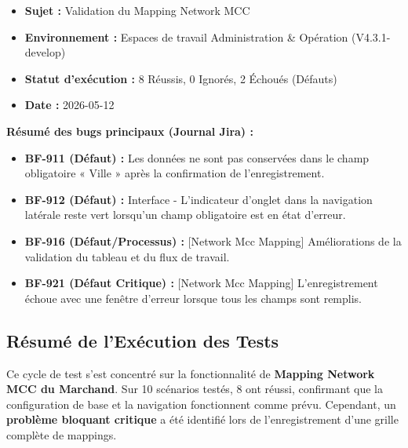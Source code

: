 \begin{tcolorbox}[colback=primary!5, colframe=primary, title=Aperçu du Projet \& Constats Critiques, arc=5pt]
    \begin{itemize}[leftmargin=1.5em]
        \item \textbf{Sujet :} Validation du Mapping Network MCC
        \item \textbf{Environnement :} Espaces de travail Administration \& Opération (V4.3.1-develop)
        \item \textbf{Statut d'exécution :} \textcolor{success}{8 Réussis}, \textcolor{warning}{0 Ignorés}, \textcolor{danger}{2 Échoués (Défauts)}
        \item \textbf{Date :} 2026-05-12
    \end{itemize}
    
    \vspace{0.3cm}
    \textbf{\large Résumé des bugs principaux (Journal Jira) :}
    \begin{itemize}[leftmargin=1.5em, itemsep=3pt]
        \item \textbf{BF-911 (Défaut) :} Les données ne sont pas conservées dans le champ obligatoire « Ville » après la confirmation de l'enregistrement.
        \item \textbf{BF-912 (Défaut) :} Interface - L'indicateur d'onglet dans la navigation latérale reste vert lorsqu'un champ obligatoire est en état d'erreur.
        \item \textbf{BF-916 (Défaut/Processus) :} [Network Mcc Mapping] Améliorations de la validation du tableau et du flux de travail.
        \item \textbf{BF-921 (Défaut Critique) :} [Network Mcc Mapping] L'enregistrement échoue avec une fenêtre d'erreur lorsque tous les champs sont remplis.
    \end{itemize}
\end{tcolorbox}

\subsection{Résumé de l'Exécution des Tests}

\begin{tcolorbox}[colback=primary!5, colframe=primary, title=\textbf{Résumé Exécutif}]
Ce cycle de test s'est concentré sur la fonctionnalité de \textbf{Mapping Network MCC du Marchand}. Sur 10 scénarios testés, 8 ont réussi, confirmant que la configuration de base et la navigation fonctionnent comme prévu. Cependant, un \textbf{problème bloquant critique} a été identifié lors de l'enregistrement d'une grille complète de mappings.
\end{tcolorbox}


